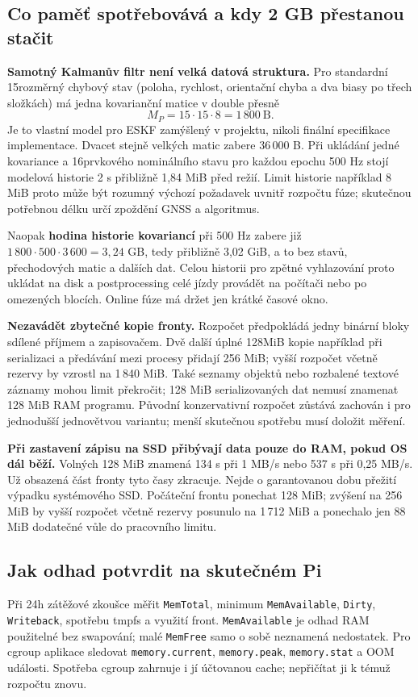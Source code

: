 \documentclass[11pt,a4paper]{article}
\newcommand{\novastrana}{\clearpage}
\begin{document}
\novastrana
\subsection{Co paměť spotřebovává a kdy 2 GB přestanou stačit}
\textbf{Samotný Kalmanův filtr není velká datová struktura.} Pro standardní 15rozměrný chybový stav (poloha, rychlost, orientační chyba a dva biasy po třech složkách) má jedna kovarianční matice v double přesně
\begin{equation}
M_P=15\cdot15\cdot8=1\,800\ \mathrm{B}.
\end{equation}
Je to vlastní model pro ESKF zamýšlený v projektu, nikoli finální specifikace implementace. Dvacet stejně velkých matic zabere 36\,000 B. Při ukládání jedné kovariance a 16prvkového nominálního stavu pro každou epochu 500 Hz stojí modelová historie 2 s přibližně 1,84 MiB před režií. Limit historie například 8 MiB proto může být rozumný výchozí požadavek uvnitř rozpočtu fúze; skutečnou potřebnou délku určí zpoždění GNSS a algoritmus.

Naopak \textbf{hodina historie kovariancí} při 500 Hz zabere již $1\,800\cdot500\cdot3\,600=3{,}24$ GB, tedy přibližně 3,02 GiB, a to bez stavů, přechodových matic a dalších dat. Celou historii pro zpětné vyhlazování proto ukládat na disk a postprocessing celé jízdy provádět na počítači nebo po omezených blocích. Online fúze má držet jen krátké časové okno.

\textbf{Nezavádět zbytečné kopie fronty.} Rozpočet předpokládá jedny binární bloky sdílené příjmem a zapisovačem. Dvě další úplné 128MiB kopie například při serializaci a předávání mezi procesy přidají 256 MiB; vyšší rozpočet včetně rezervy by vzrostl na 1\,840 MiB. Také seznamy objektů nebo rozbalené textové záznamy mohou limit překročit; 128 MiB serializovaných dat nemusí znamenat 128 MiB RAM programu. Původní konzervativní rozpočet zůstává zachován i pro jednodušší jednovětvou variantu; menší skutečnou spotřebu musí doložit měření.

\textbf{Při zastavení zápisu na SSD přibývají data pouze do RAM, pokud OS dál běží.} Volných 128 MiB znamená 134 s při 1 MB/s nebo 537 s při 0,25 MB/s. Už obsazená část fronty tyto časy zkracuje. Nejde o garantovanou dobu přežití výpadku systémového SSD. Počáteční frontu ponechat 128 MiB; zvýšení na 256 MiB by vyšší rozpočet včetně rezervy posunulo na 1\,712 MiB a ponechalo jen 88 MiB dodatečné vůle do pracovního limitu.

\subsection{Jak odhad potvrdit na skutečném Pi}
Při 24h zátěžové zkoušce měřit \texttt{MemTotal}, minimum \texttt{MemAvailable}, \texttt{Dirty}, \texttt{Writeback}, spotřebu tmpfs a využití front. \texttt{MemAvailable} je odhad RAM použitelné bez swapování; malé \texttt{MemFree} samo o sobě neznamená nedostatek.\cite{procmem} Pro cgroup aplikace sledovat \texttt{memory.current}, \texttt{memory.peak}, \texttt{memory.stat} a OOM události. Spotřeba cgroup zahrnuje i jí účtovanou cache; nepřičítat ji k témuž rozpočtu znovu.\cite{cgroupmem}
\end{document}
